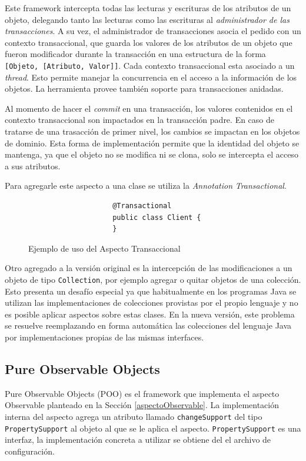 		\medskip
		 
		Este framework intercepta todas las lecturas y escrituras de los atributos de
		un objeto, delegando tanto las lecturas como las escrituras al
		\emph{administrador de las transacciones}.
		A su vez, el administrador de transacciones asocia el pedido con un contexto
		transaccional, que guarda los valores de los atributos de un objeto que fueron
		modificador durante la transacción en una estructura de la forma
		\lstinline|[Objeto, [Atributo, Valor]]|.
		Cada contexto transaccional esta asociado a un \emph{thread}. Esto
		permite manejar la concurrencia en el acceso a la información de los objetos.
		La herramienta provee también soporte para transacciones anidadas.
		 
		Al momento de hacer el \emph{commit} en una transacción, los valores
		contenidos en el contexto transaccional son impactados en la transacción
		padre.
		En caso de tratarse de una trasacción de primer nivel, los cambios se impactan
		en los objetos de dominio.
		Esta forma de implementación permite que la identidad del objeto se
		mantenga, ya que el objeto no se modifica ni se clona, solo se intercepta el
		acceso a sus atributos.
		
		Para agregarle este aspecto a una clase se utiliza la \emph{Annotation}
		\emph{Transactional}.
				
		\begin{figure}[h]
				\begin{lstlisting} 
					@Transactional
					public class Client {
					}
				\end{lstlisting}
			\caption{Ejemplo de uso del Aspecto Transaccional}
			\label{pot}
		\end{figure}  

		\medskip
		
		Otro agregado a la versión original es la intercepción de las modificaciones 
		a un objeto de tipo \lstinline|Collection|, por ejemplo agregar o quitar
		objetos de una colección.
		Esto presenta un desafío especial ya que habitualmente en los programas Java
		se utilizan las implementaciones de colecciones provistas por el propio
		lenguaje y no es posible aplicar aspectos sobre estas clases. 
		En la nueva versión, este problema se resuelve reemplazando en forma
		automática las colecciones del lenguaje Java por
		implementaciones propias de las mismas interfaces.

	\subsection{Pure Observable Objects}
		\label{poo}
		Pure Observable Objects (POO) es el framework que implementa el
		aspecto Observable planteado en la Sección \ref{aspectoObservable}.
		La implementación interna del aspecto agrega un
		atributo llamado \lstinline|changeSupport| del tipo
		\lstinline|PropertySupport| al objeto al que se le aplica el aspecto.
		\lstinline|PropertySupport| es una interfaz, la implementación concreta a
		utilizar se obtiene del el archivo de configuración.
		
